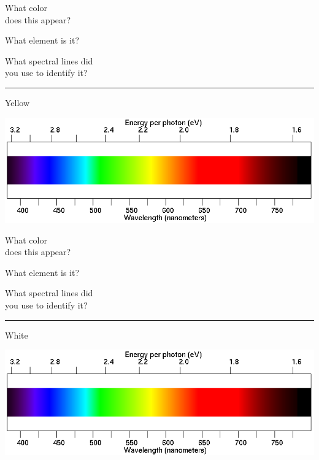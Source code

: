 \documentclass[11pt]{article}
\begin{document}
\begin{minipage}{0.33\textwidth}
	What color \\does this appear?
\end{minipage}
\begin{minipage}{0.33\textwidth}
	What element is it?
\end{minipage}
\begin{minipage}{0.33\textwidth}
	What spectral lines did\\
	you use to identify it?
\end{minipage}

\vspace{1in}
\hrule



\begin{minipage}{0.1\textwidth}
	\begin{center}
		\large Yellow
	\end{center}
\end{minipage}
\begin{minipage}{0.8\textwidth}
	\includegraphics[width=\textwidth]{spectrum2.png}
\end{minipage}

\begin{minipage}{0.33\textwidth}
	What color \\does this appear?
\end{minipage}
\begin{minipage}{0.33\textwidth}
	What element is it?
\end{minipage}
\begin{minipage}{0.33\textwidth}
	What spectral lines did\\
	you use to identify it?
\end{minipage}

\vspace{1in}
\hrule
\begin{minipage}{0.1\textwidth}
	\begin{center}
		\large White
	\end{center}
\end{minipage}
\begin{minipage}{0.8\textwidth}
	\includegraphics[width=\textwidth]{spectrum2.png}
\end{minipage}
\end{document}
